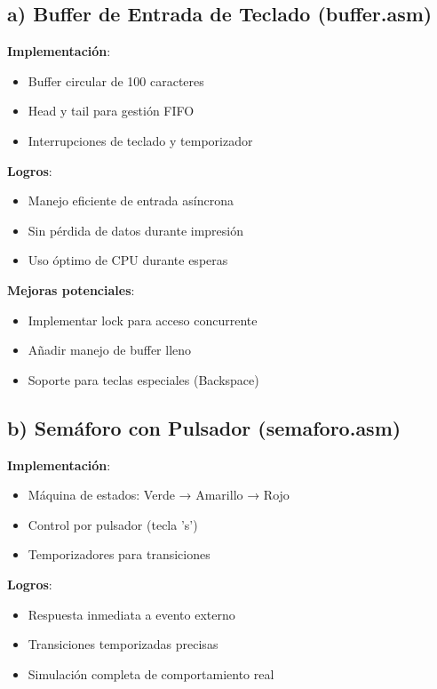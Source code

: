 \documentclass[12pt]{article}
\begin{document}
\subsection*{a) Buffer de Entrada de Teclado (buffer.asm)}
\textbf{Implementación}:
\begin{itemize}
    \item Buffer circular de 100 caracteres
    \item Head y tail para gestión FIFO
    \item Interrupciones de teclado y temporizador
\end{itemize}

\textbf{Logros}:
\begin{itemize}
    \item Manejo eficiente de entrada asíncrona
    \item Sin pérdida de datos durante impresión
    \item Uso óptimo de CPU durante esperas
\end{itemize}

\textbf{Mejoras potenciales}:
\begin{itemize}
    \item Implementar lock para acceso concurrente
    \item Añadir manejo de buffer lleno
    \item Soporte para teclas especiales (Backspace)
\end{itemize}

\subsection*{b) Semáforo con Pulsador (semaforo.asm)}
\textbf{Implementación}:
\begin{itemize}
    \item Máquina de estados: Verde → Amarillo → Rojo
    \item Control por pulsador (tecla 's')
    \item Temporizadores para transiciones
\end{itemize}

\textbf{Logros}:
\begin{itemize}
    \item Respuesta inmediata a evento externo
    \item Transiciones temporizadas precisas
    \item Simulación completa de comportamiento real
\end{itemize}
\end{document}
